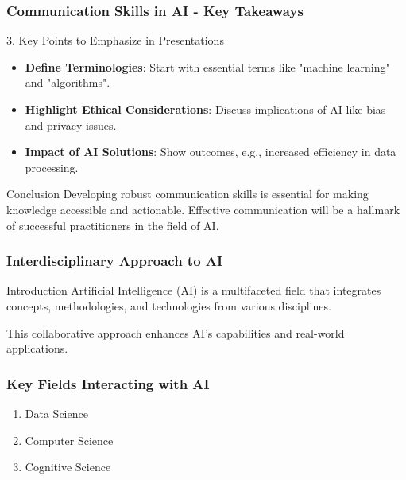 \documentclass[aspectratio=169]{beamer}
\begin{document}
\begin{frame}[fragile]
    \frametitle{Communication Skills in AI - Key Takeaways}
    \begin{block}{3. Key Points to Emphasize in Presentations}
        \begin{itemize}
            \item \textbf{Define Terminologies}: Start with essential terms like "machine learning" and "algorithms".
            \item \textbf{Highlight Ethical Considerations}: Discuss implications of AI like bias and privacy issues.
            \item \textbf{Impact of AI Solutions}: Show outcomes, e.g., increased efficiency in data processing.
        \end{itemize}
    \end{block}
    
    \begin{block}{Conclusion}
        Developing robust communication skills is essential for making knowledge accessible and actionable. Effective communication will be a hallmark of successful practitioners in the field of AI.
    \end{block}
\end{frame}

\begin{frame}[fragile]
    \frametitle{Interdisciplinary Approach to AI}
    \begin{block}{Introduction}
        Artificial Intelligence (AI) is a multifaceted field that integrates concepts, methodologies, and technologies from various disciplines.
    \end{block}
    This collaborative approach enhances AI's capabilities and real-world applications.
\end{frame}

\begin{frame}[fragile]
    \frametitle{Key Fields Interacting with AI}
    \begin{enumerate}
        \item Data Science
        \item Computer Science
        \item Cognitive Science
    \end{enumerate}
\end{frame}
\end{document}
